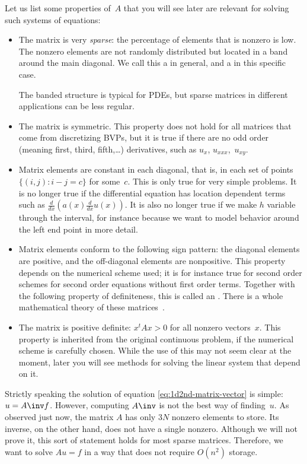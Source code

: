 Let us
list some properties of~$A$ that you will see later
are relevant for solving such systems
of equations:
\begin{itemize}
\item The matrix is very \emph{sparse}: the
  percentage of elements that is nonzero is low. The nonzero elements
  are not randomly distributed but located in a band around the main
  diagonal. We call this a  in general, and a
   in this specific case.

  The banded structure is typical for \acp{PDE}, but sparse matrices
  in different applications can be less regular.
\item The matrix is symmetric. This property does not hold for all
  matrices that come from discretizing \ac{BVP}s, but it is true if
  there are no odd order (meaning first, third, fifth,\ldots)
  derivatives, such as $u_x$, $u_{xxx}$,~$u_{xy}$.
\item Matrix elements are constant in each diagonal, that is, in each
  set of points $\{(i,j)\colon i-j=c\}$ for some~$c$. This is only
  true for very simple problems. It is no longer true if the
  differential equation has location dependent terms such as $\frac
  d{dx}(a(x)\frac d{dx}u(x))$. It is also no longer true if we make
  $h$ variable through the interval, for instance because we want to
  model behavior around the left end point in more detail.
\item Matrix elements conform to the following sign pattern: the
  diagonal elements are positive, and the off-diagonal elements are
  nonpositive. This property depends on the numerical scheme used;
  it is for instance true for second order schemes for
  second order equations without first order terms.
  Together with the following property of
  definiteness, this is called an . There is a
  whole mathematical theory of these matrices~\cite{BePl:book}.
\item The matrix is positive definite: $x^tAx>0$ for all nonzero
  vectors~$x$. This property is inherited from the original continuous
  problem, if the numerical scheme is carefully chosen. While the use
  of this may not seem clear at the moment, later you will see methods
  for solving the linear system that depend on it.
\end{itemize}

Strictly speaking the solution of equation
\eqref{eq:1d2nd-matrix-vector} is simple: $u=A\inv f$. However, 
computing $A\inv$
is not the best way of finding~$u$. As observed just now, the matrix
$A$ has only $3N$ nonzero elements to store. Its inverse, on the other
hand, does not have a single nonzero. Although we will not prove it,
this sort of statement holds for most sparse matrices. Therefore, we
want to solve $Au=f$ in a way that does not require $O(n^2)$ storage.

